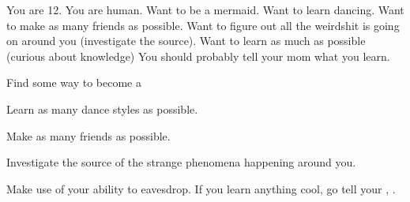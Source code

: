 \documentclass[char]{NeptuneBall}
\begin{document}
\name{\cWillow{}}

You are 12. You are human. Want to be a mermaid. Want to learn dancing. Want to make as many friends as possible.  Want to figure out all the weirdshit is going on around you (investigate the source). Want to learn as much as possible (curious about knowledge) You should probably tell your mom what you learn.

\begin{itemz}[Goals]
  \item Find some way to become a \cWillow{\mer}
  \item Learn as many dance styles as possible.
  \item Make as many friends as possible.
  \item Investigate the source of the strange phenomena happening around you.
  \item Make use of your ability to eavesdrop. If you learn anything cool, go tell your \cAriel{\parent}, \cAriel{}.
\end{itemz}

\begin{contacts}
  \contact{}
\end{contacts}
\end{document}
